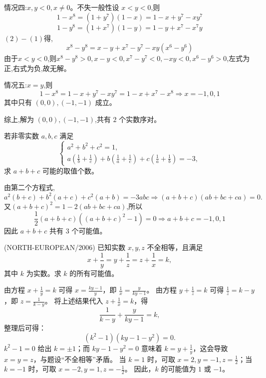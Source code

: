 \begin{questions}
\begin{solution}
        情况四:$x,y<0, x \ne 0$。不失一般性设 $x<y<0$,则
        \[
        1-x^8=(1+y^7)(1-x)=1-x+y^7-xy^7 \tag{1}
        \]
        \[
        1-y^8=(1+x^7)(1-y)=1-y+x^7-x^7y \tag{2}
        \]
        $(2)-(1)$得,
        \[
        x^8-y^8=x-y+x^7-y^7-xy(x^6-y^6)
        \]
        由于$x<y<0$,则$x^8-y^8>0,x-y<0,x^7-y^7<0,-xy<0,x^6-y^6>0$,左式为正,右式为负,故无解。

        情况五:$x=y$,则
        \[
        1-x^8=1-x+y^7-xy^7=1-x+x^7-x^8 \Rightarrow x=-1,0,1
        \] 
        其中只有 $(0,0),(-1,-1)$ 成立。  

        综上,解为 $(0,0),(-1,-1)$,共有 $2$ 个实数序对。
    \end{solution}

    \question 若非零实数 $a,b,c$ 满足
    \[
    \begin{cases}
    a^2 + b^2 + c^2 = 1,\\[1mm]
    \displaystyle a\left(\frac{1}{b}+\frac{1}{c}\right)+b\left(\frac{1}{a}+\frac{1}{c}\right)+c\left(\frac{1}{a}+\frac{1}{b}\right) = -3,
    \end{cases}
    \]
    求 $a+b+c$ 可能的取值个数。
    \begin{solution}
        由第二个方程式,
        \[
        a^2(b+c) + b^2(a+c) + c^2(a+b) = -3abc \Rightarrow (a+b+c)(ab+bc+ca)=0.
        \]
        又$(a+b+c)^2=1-2(ab+bc+ca)$,所以
        \[
        \frac{1}{2}(a+b+c)((a+b+c)^2-1)=0 \Rightarrow a+b+c=-1,0,1
        \]
        因此 $a+b+c$ 共有 $3$ 个可能值。
    \end{solution}

    \question (NORTH-EUROPEAN/2006) 已知实数 $x, y, z$ 不全相等，且满足
\[
x + \frac{1}{y} = y + \frac{1}{z} = z + \frac{1}{x} = k,
\]
其中 $k$ 为实数。求 $k$ 的所有可能值。

\begin{solution}
由方程 $x + \frac{1}{y} = k$ 可得 $x = \frac{ky - 1}{y}$，即 $\frac{1}{x} = \frac{y}{ky - 1}$。
由方程 $y + \frac{1}{z} = k$ 可得 $\frac{1}{z} = k - y$，即 $z = \frac{1}{k - y}$。
将上述结果代入 $z + \frac{1}{x} = k$，得
\[
\frac{1}{k - y} + \frac{y}{ky - 1} = k,
\]
整理后可得：
\[
(k^2 - 1)(ky - 1 - y^2) = 0.
\]
$k^2 - 1 = 0$ 给出 $k = \pm 1$；而 $ky - 1 - y^2 = 0$ 意味着 $k = y + \frac{1}{y}$，这会导致 $x = y = z$，与题设“不全相等”矛盾。
当 $k = 1$ 时，可取 $x = 2, y = -1, z = \frac{1}{2}$；当 $k = -1$ 时，可取 $x = -2, y = 1, z = -\frac{1}{2}$。
因此，$k$ 的可能值为 $1$ 或 $-1$。
\end{solution}


\end{questions}
